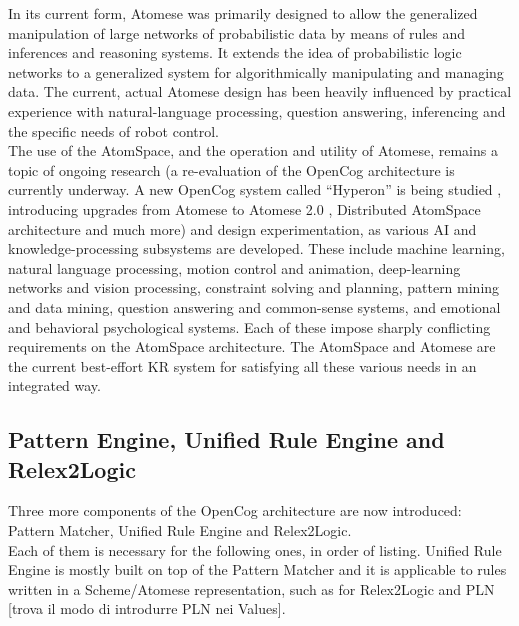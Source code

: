 In its current form, Atomese was primarily designed to allow the generalized manipulation of large networks of probabilistic data by means of rules and inferences and reasoning systems. It extends the idea of probabilistic logic networks to a generalized system for algorithmically manipulating and managing data. The current, actual Atomese design has been heavily influenced by practical experience with natural-language processing, question answering, inferencing and the specific needs of robot control. \\



The use of the AtomSpace, and the operation and utility of Atomese, remains a topic of ongoing research (a re-evaluation of the OpenCog architecture is currently underway. A new OpenCog system called \enquote{Hyperon} is being studied \cite{goertzel_potapov_senna_singularitynet-opencog_team_2020}, introducing upgrades from Atomese to Atomese 2.0 \cite{DBLP:journals/corr/abs-2004-05267}, Distributed AtomSpace architecture \cite{distributed_2017, senna_2018, potapov_2020_1, potapov_2020_2} and much more) and design experimentation, as various AI and knowledge-processing subsystems are developed. These include machine learning, natural language processing, motion control and animation, deep-learning networks and vision processing, constraint solving and planning, pattern mining and data mining, question answering and common-sense systems, and emotional and behavioral psychological systems. Each of these impose sharply conflicting requirements on the AtomSpace architecture. The AtomSpace and Atomese are the current best-effort KR system for satisfying all these various needs in an integrated way.

\subsection{Pattern Engine, Unified Rule Engine and Relex2Logic}\label{sec:pattern_ur_engine}

Three more components of the OpenCog architecture are now introduced: Pattern Matcher, Unified Rule Engine and Relex2Logic. \\
Each of them is necessary for the following ones, in order of listing.
Unified Rule Engine is mostly built on top of the Pattern Matcher and it is applicable to rules written in a Scheme/Atomese representation, such as for Relex2Logic and PLN [trova il modo di introdurre PLN nei Values].

